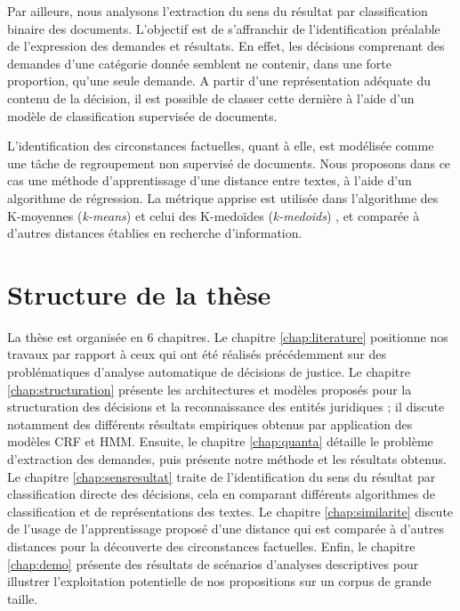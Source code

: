 Par ailleurs, nous analysons l'extraction du sens du résultat par classification binaire des documents. L'objectif est de s'affranchir de l'identification préalable de l'expression des demandes et résultats. En effet, les décisions comprenant des demandes d'une catégorie donnée semblent ne contenir, dans une forte proportion, qu'une seule demande. %
A partir d'une représentation adéquate du contenu de la décision, il est possible de classer cette dernière à l'aide d'un modèle de classification supervisée de documents.

L'identification des circonstances factuelles, quant à elle, est modélisée comme une tâche de regroupement non supervisé de documents. Nous proposons dans ce cas une méthode d'apprentissage d'une distance entre textes, à l'aide d'un algorithme de régression. La métrique apprise est utilisée dans l'algorithme des \og K-moyennes \fg{} (\textit{k-means}) \citep{forgey1965kmeans} et celui des \og K-medoïdes \fg{} (\textit{k-medoids}) \citep{kaufman1987kmedoids}, et comparée à d'autres distances établies en recherche d'information.

\section{Structure de la thèse}
\label{sec:intro:organisation}

La thèse est organisée en 6 chapitres. Le chapitre \ref{chap:literature} positionne nos travaux par rapport à ceux qui ont été réalisés précédemment sur des problématiques d'analyse automatique de décisions de justice. Le chapitre \ref{chap:structuration} présente les architectures et modèles proposés pour la structuration des décisions et la reconnaissance des entités juridiques ; il discute notamment des différents résultats empiriques obtenus par application des modèles CRF et HMM. Ensuite, le chapitre \ref{chap:quanta} détaille le problème  d'extraction des demandes, puis présente notre méthode et les résultats obtenus. Le chapitre \ref{chap:sensresultat} traite de l'identification du sens du résultat par classification directe des décisions, cela en comparant différents algorithmes de classification et de représentations des textes. Le chapitre \ref{chap:similarite} discute de l'usage de l'apprentissage proposé d'une distance qui est comparée à d'autres distances pour la découverte des circonstances factuelles. Enfin, le chapitre \ref{chap:demo} présente des résultats de scénarios d'analyses descriptives pour illustrer l'exploitation potentielle de nos propositions sur un corpus de grande taille. 
